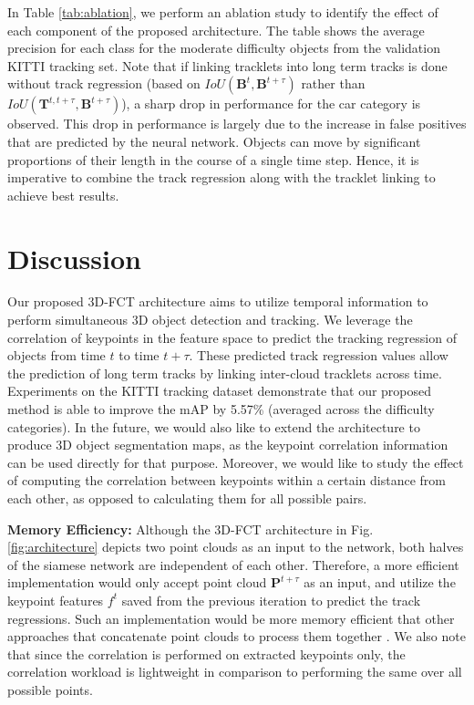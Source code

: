 \documentclass[10pt,twocolumn,letterpaper]{article}
\begin{document}
In Table \ref{tab:ablation}, we perform an ablation study to identify the effect of each component of the proposed architecture. The table shows the average precision for each class for the moderate difficulty objects from the validation KITTI tracking set. Note that if linking tracklets into long term tracks is done without track regression (based on $IoU(\textbf{B}^t, \textbf{B}^{t+\tau})$ rather than $IoU(\textbf{T}^{t,t+\tau}, \textbf{B}^{t+\tau})$), a sharp drop in performance for the car category is observed. This drop in performance is largely due to the increase in false positives that are predicted by the neural network. Objects can move by significant proportions of their length in the course of a single time step. Hence, it is imperative to combine the track regression along with the tracklet linking to achieve best results.

\section{Discussion}\label{sec:discussion}
Our proposed 3D-FCT architecture aims to utilize temporal information to perform simultaneous 3D object detection and tracking. We leverage the correlation of keypoints in the feature space to predict the tracking regression of objects from time $t$ to time $t+\tau$. These predicted track regression values allow the prediction of long term tracks by linking inter-cloud tracklets across time. Experiments on the KITTI tracking dataset demonstrate that our proposed method is able to improve the mAP by 5.57\% (averaged across the difficulty categories). In the future, we would also like to extend the architecture to produce 3D object segmentation maps, as the keypoint correlation information can be used directly for that purpose. Moreover, we would like to study the effect of computing the correlation between keypoints within a certain distance from each other, as opposed to calculating them for all possible pairs.

\textbf{Memory Efficiency:} Although the 3D-FCT architecture in Fig. \ref{fig:architecture} depicts two point clouds as an input to the network, both halves of the siamese network are independent of each other. Therefore, a more efficient implementation would only accept point cloud $\mathbf{P}^{t+\tau}$ as an input, and utilize the keypoint features $f^t$ saved from the previous iteration to predict the track regressions. Such an implementation would be more memory efficient that other approaches that concatenate point clouds to process them together \cite{Lang_2019_CVPR,Luo2018}. We also note that since the correlation is performed on extracted keypoints only, the correlation workload is lightweight in comparison to performing the same over all possible points.
\end{document}
